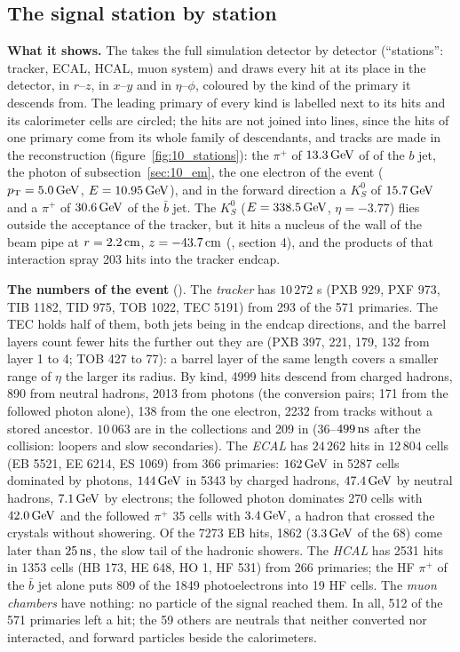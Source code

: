 \FloatBarrier
\subsection{The signal station by station}
\label{sec:10_stations}

\textbf{What it shows.} The  takes the full simulation detector by detector (``stations'':
tracker, ECAL, HCAL, muon system) and draws every hit at its place in the detector, in $r$--$z$, in $x$--$y$ and in
$\eta$--$\phi$, coloured by the kind of the primary it descends from. The leading primary of every kind is labelled
next to its hits and its calorimeter cells are circled; the hits are not joined into lines, since the hits of one
primary come from its whole family of descendants, and tracks are made in the reconstruction
(figure~\ref{fig:10_stations}): the $\pi^+$ of $13.3\,\mathrm{GeV}$ of \pt{} of the $b$ jet, the photon of
subsection~\ref{sec:10_em}, the one electron of the event ($p_{\mathrm{T}}=5.0\,\mathrm{GeV}$, $E=10.95\,\mathrm{GeV}$), and in the forward
direction a $K^0_S$ of $15.7\,\mathrm{GeV}$ and a $\pi^+$ of $30.6\,\mathrm{GeV}$ of the $\bar b$ jet. The $K^0_S$ ($E=338.5\,\mathrm{GeV}$,
$\eta=-3.77$) flies outside the acceptance of the tracker, but it hits a nucleus of the wall of the beam pipe at
$r=2.2\,\mathrm{cm}$, $z=-43.7\,\mathrm{cm}$ (, section 4), and the products of that interaction spray 203
hits into the tracker endcap.

\textbf{The numbers of the event} (). The \emph{tracker} has $10\,272$
s (PXB 929, PXF 973, TIB 1182, TID 975, TOB 1022, TEC 5191) from 293 of the 571 primaries. The TEC holds
half of them, both jets being in the endcap directions, and the barrel layers count fewer hits the further out they
are (PXB 397, 221, 179, 132 from layer 1 to 4; TOB 427 to 77): a barrel layer of the same length covers a smaller
range of $\eta$ the larger its radius. By kind, 4999 hits descend from charged hadrons, 890 from neutral hadrons,
2013 from photons (the conversion pairs; 171 from the followed photon alone), 138 from the one electron, 2232 from
tracks without a stored ancestor. $10\,063$ are in the  collections and
209 in  ($36$--$499\,\mathrm{ns}$ after the collision: loopers and slow secondaries). The \emph{ECAL} has $24\,262$
hits in $12\,804$ cells (EB 5521, EE 6214, ES 1069) from 366 primaries: $162\,\mathrm{GeV}$ in 5287 cells dominated by photons,
$144\,\mathrm{GeV}$ in 5343 by charged hadrons, $47.4\,\mathrm{GeV}$ by neutral hadrons, $7.1\,\mathrm{GeV}$ by electrons; the followed photon
dominates 270 cells with $42.0\,\mathrm{GeV}$ and the followed $\pi^+$ 35 cells with $3.4\,\mathrm{GeV}$, a hadron that crossed the
crystals without showering. Of the 7273 EB hits, 1862 ($3.3\,\mathrm{GeV}$ of the 68) come later than $25\,\mathrm{ns}$, the slow tail of
the hadronic showers. The \emph{HCAL} has 2531 hits in 1353 cells (HB 173, HE 648, HO 1, HF 531) from 266 primaries;
the HF $\pi^+$ of the $\bar b$ jet alone puts 809 of the 1849 photoelectrons into 19 HF cells. The \emph{muon
chambers} have nothing: no particle of the signal reached them. In all, 512 of the 571 primaries left a hit; the 59
others are neutrals that neither converted nor interacted, and forward particles beside the calorimeters.

